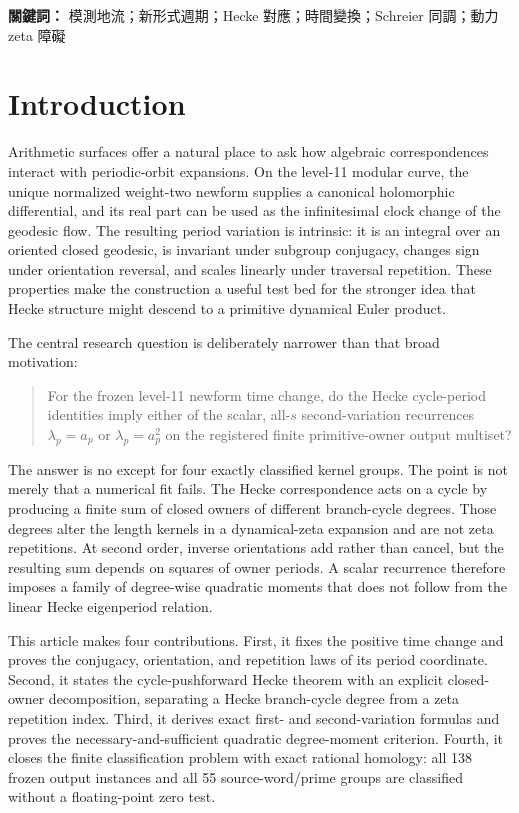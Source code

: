 \documentclass[11pt]{article}
\theoremstyle{definition}
\theoremstyle{remark}
\begin{document}
\medskip
\noindent\textbf{關鍵詞：} 模測地流；新形式週期；Hecke 對應；時間變換；Schreier 同調；動力 zeta 障礙

\section{Introduction}

Arithmetic surfaces offer a natural place to ask how algebraic correspondences interact with periodic-orbit expansions. On the level-11 modular curve, the unique normalized weight-two newform supplies a canonical holomorphic differential, and its real part can be used as the infinitesimal clock change of the geodesic flow. The resulting period variation is intrinsic: it is an integral over an oriented closed geodesic, is invariant under subgroup conjugacy, changes sign under orientation reversal, and scales linearly under traversal repetition. These properties make the construction a useful test bed for the stronger idea that Hecke structure might descend to a primitive dynamical Euler product.

The central research question is deliberately narrower than that broad motivation:

\begin{quote}
For the frozen level-11 newform time change, do the Hecke cycle-period identities imply either of the scalar, all-$s$ second-variation recurrences $\lambda_p=a_p$ or $\lambda_p=a_p^2$ on the registered finite primitive-owner output multiset?
\end{quote}

The answer is no except for four exactly classified kernel groups. The point is not merely that a numerical fit fails. The Hecke correspondence acts on a cycle by producing a finite sum of closed owners of different branch-cycle degrees. Those degrees alter the length kernels in a dynamical-zeta expansion and are not zeta repetitions. At second order, inverse orientations add rather than cancel, but the resulting sum depends on squares of owner periods. A scalar recurrence therefore imposes a family of degree-wise quadratic moments that does not follow from the linear Hecke eigenperiod relation.

This article makes four contributions. First, it fixes the positive time change and proves the conjugacy, orientation, and repetition laws of its period coordinate. Second, it states the cycle-pushforward Hecke theorem with an explicit closed-owner decomposition, separating a Hecke branch-cycle degree from a zeta repetition index. Third, it derives exact first- and second-variation formulas and proves the necessary-and-sufficient quadratic degree-moment criterion. Fourth, it closes the finite classification problem with exact rational homology: all 138 frozen output instances and all 55 source-word/prime groups are classified without a floating-point zero test.
\end{document}
